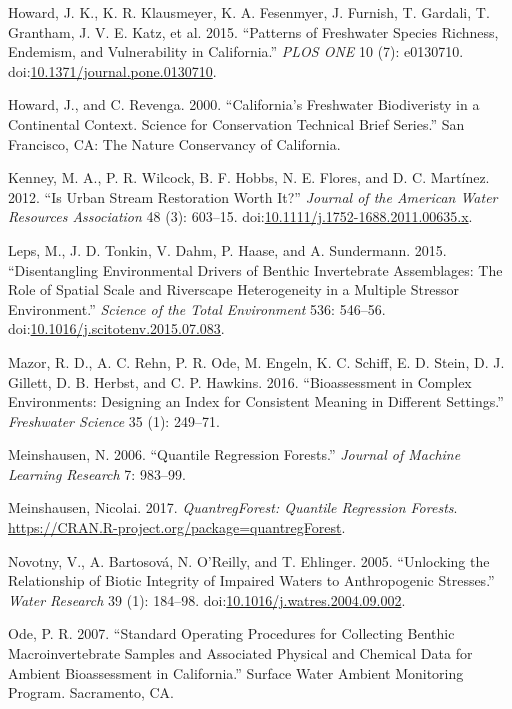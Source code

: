 \documentclass[]{article}
\begin{document}
\hypertarget{ref-Howard15}{}
Howard, J. K., K. R. Klausmeyer, K. A. Fesenmyer, J. Furnish, T.
Gardali, T. Grantham, J. V. E. Katz, et al. 2015. ``Patterns of
Freshwater Species Richness, Endemism, and Vulnerability in
California.'' \emph{PLOS ONE} 10 (7): e0130710.
doi:\href{https://doi.org/10.1371/journal.pone.0130710}{10.1371/journal.pone.0130710}.

\hypertarget{ref-Howard09}{}
Howard, J., and C. Revenga. 2000. ``California's Freshwater Biodiveristy
in a Continental Context. Science for Conservation Technical Brief
Series.'' San Francisco, CA: The Nature Conservancy of California.

\hypertarget{ref-Kenney12}{}
Kenney, M. A., P. R. Wilcock, B. F. Hobbs, N. E. Flores, and D. C.
Martínez. 2012. ``Is Urban Stream Restoration Worth It?'' \emph{Journal
of the American Water Resources Association} 48 (3): 603--15.
doi:\href{https://doi.org/10.1111/j.1752-1688.2011.00635.x}{10.1111/j.1752-1688.2011.00635.x}.

\hypertarget{ref-Leps15}{}
Leps, M., J. D. Tonkin, V. Dahm, P. Haase, and A. Sundermann. 2015.
``Disentangling Environmental Drivers of Benthic Invertebrate
Assemblages: The Role of Spatial Scale and Riverscape Heterogeneity in a
Multiple Stressor Environment.'' \emph{Science of the Total Environment}
536: 546--56.
doi:\href{https://doi.org/10.1016/j.scitotenv.2015.07.083}{10.1016/j.scitotenv.2015.07.083}.

\hypertarget{ref-Mazor16}{}
Mazor, R. D., A. C. Rehn, P. R. Ode, M. Engeln, K. C. Schiff, E. D.
Stein, D. J. Gillett, D. B. Herbst, and C. P. Hawkins. 2016.
``Bioassessment in Complex Environments: Designing an Index for
Consistent Meaning in Different Settings.'' \emph{Freshwater Science} 35
(1): 249--71.

\hypertarget{ref-Meinshausen06}{}
Meinshausen, N. 2006. ``Quantile Regression Forests.'' \emph{Journal of
Machine Learning Research} 7: 983--99.

\hypertarget{ref-Meinshausen17}{}
Meinshausen, Nicolai. 2017. \emph{QuantregForest: Quantile Regression
Forests}. \url{https://CRAN.R-project.org/package=quantregForest}.

\hypertarget{ref-Novotny05}{}
Novotny, V., A. Bartosová, N. O'Reilly, and T. Ehlinger. 2005.
``Unlocking the Relationship of Biotic Integrity of Impaired Waters to
Anthropogenic Stresses.'' \emph{Water Research} 39 (1): 184--98.
doi:\href{https://doi.org/10.1016/j.watres.2004.09.002}{10.1016/j.watres.2004.09.002}.

\hypertarget{ref-Ode07}{}
Ode, P. R. 2007. ``Standard Operating Procedures for Collecting Benthic
Macroinvertebrate Samples and Associated Physical and Chemical Data for
Ambient Bioassessment in California.'' Surface Water Ambient Monitoring
Program. Sacramento, CA.
\end{document}
